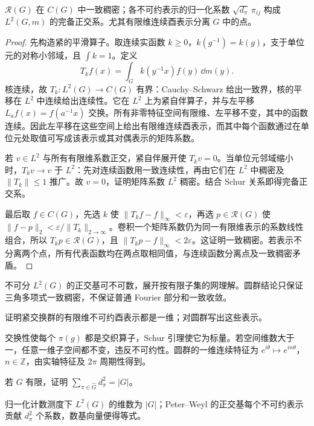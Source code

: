 \begin{theorem}\label{thm:y11-peter-weyl}
$\mathcal R(G)$ 在 $C(G)$ 中一致稠密；各不可约表示的归一化系数 $\sqrt{d_\pi}\,\pi_{ij}$ 构成 $L^2(G,m)$ 的完备正交系。尤其有限维连续酉表示分离 $G$ 中的点。
\end{theorem}
\begin{proof}
先构造紧的平滑算子。取连续实函数 $k\ge0$，$k(g^{-1})=k(g)$，支于单位元的对称小邻域，且 $\int k=1$。定义
\[
 T_kf(x)=\int_G k(y^{-1}x)f(y)\,\dd m(y).
\]
核连续，故 $T_k:L^2(G)\to C(G)$ 有界：Cauchy--Schwarz 给出一致界，核的平移在 $L^2$ 中连续给出连续性。它在 $L^2$ 上为紧自伴算子，并与左平移 $L_af(x)=f(a^{-1}x)$ 交换。所有非零特征空间有限维、左平移不变，其中的函数连续。因此左平移在这些空间上给出有限维连续酉表示，而其中每个函数通过在单位元处取值可写成该表示或其对偶表示的矩阵系数。

若 $v\in L^2$ 与所有有限维系数正交，紧自伴展开使 $T_kv=0$。当单位元邻域缩小时，$T_kv\to v$ 于 $L^2$：先对连续函数用一致连续性，再由它们在 $L^2$ 中稠密及 $\|T_k\|\le1$ 推广。故 $v=0$，证明矩阵系数 $L^2$ 稠密。结合 Schur 关系即得完备正交系。

最后取 $f\in C(G)$，先选 $k$ 使 $\|T_kf-f\|_\infty<\varepsilon$，再选 $p\in\mathcal R(G)$ 使 $\|f-p\|_2<\varepsilon/\|T_k\|_{2\to\infty}$。卷积一个矩阵系数仍为同一有限维表示的系数线性组合，所以 $T_kp\in\mathcal R(G)$，且 $\|T_kp-f\|_\infty<2\varepsilon$。这证明一致稠密。若表示不分离两个点，所有代表函数均在两点取相同值，与连续函数分离点及一致稠密矛盾。
\end{proof}

不可分 $L^2(G)$ 的正交基可不可数，展开按有限子集的网理解。圆群结论只保证三角多项式一致稠密，不保证普通 Fourier 部分和一致收敛。

\begin{exercise}[紧交换群的不可约表示]\label{ex:y11-abelian-representations}
证明紧交换群的有限维不可约酉表示都是一维；对圆群写出这些表示。
\end{exercise}
\begin{solution}
交换性使每个 $\pi(g)$ 都是交织算子，Schur 引理使它为标量。若空间维数大于一，任意一维子空间都不变，违反不可约性。圆群的一维连续特征为 $e^{i\theta}\mapsto e^{in\theta}$，$n\in\mathbb Z$，由实轴特征及 $2\pi$ 周期性得到。
\end{solution}

\begin{exercise}[有限群的维数公式]\label{ex:y11-finite-group}
若 $G$ 有限，证明 $\sum_{\pi\in\widehat G}d_\pi^2=|G|$。
\end{exercise}
\begin{solution}
归一化计数测度下 $L^2(G)$ 的维数为 $|G|$；Peter--Weyl 的正交基每个不可约表示贡献 $d_\pi^2$ 个系数，数基向量便得等式。
\end{solution}
